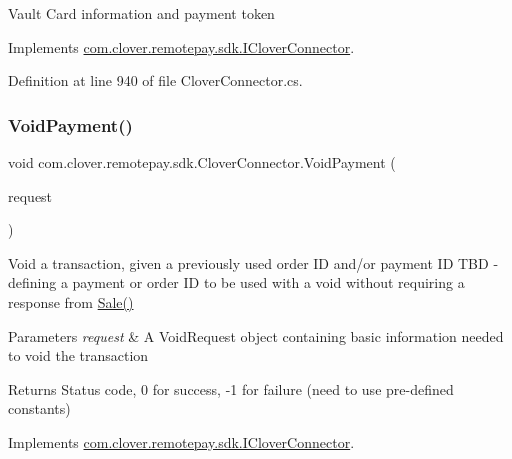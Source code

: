 Vault Card information and payment token 



Implements \hyperlink{interfacecom_1_1clover_1_1remotepay_1_1sdk_1_1_i_clover_connector_a1d501a736452123be1dd8f42157389e3}{com.\+clover.\+remotepay.\+sdk.\+I\+Clover\+Connector}.



Definition at line 940 of file Clover\+Connector.\+cs.

\mbox{\label{classcom_1_1clover_1_1remotepay_1_1sdk_1_1_clover_connector_aa987ae8606b8b2f4a235e9c09ffeef3b}} 
\subsubsection{\texorpdfstring{Void\+Payment()}{VoidPayment()}}
{\footnotesize\ttfamily void com.\+clover.\+remotepay.\+sdk.\+Clover\+Connector.\+Void\+Payment (\begin{DoxyParamCaption}\item[{\hyperlink{classcom_1_1clover_1_1remotepay_1_1sdk_1_1_void_payment_request}{Void\+Payment\+Request}}]{request }\end{DoxyParamCaption})}



Void a transaction, given a previously used order ID and/or payment ID T\+BD -\/ defining a payment or order ID to be used with a void without requiring a response from \hyperlink{classcom_1_1clover_1_1remotepay_1_1sdk_1_1_clover_connector_a1adbcc8a0d4aaa82157a102af4f16b91}{Sale()} 


\begin{DoxyParams}{Parameters}
{\em request} & A Void\+Request object containing basic information needed to void the transaction\\
\hline
\end{DoxyParams}
\begin{DoxyReturn}{Returns}
Status code, 0 for success, -\/1 for failure (need to use pre-\/defined constants)
\end{DoxyReturn}


Implements \hyperlink{interfacecom_1_1clover_1_1remotepay_1_1sdk_1_1_i_clover_connector_af35e223ba760d0a6d61c67895c619997}{com.\+clover.\+remotepay.\+sdk.\+I\+Clover\+Connector}.




